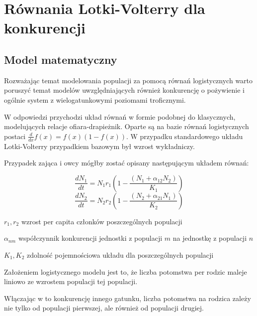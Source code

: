 \chapter{Równania Lotki-Volterry dla konkurencji}

\section{Model matematyczny}

\noindent Rozważając temat modelowania populacji za pomocą równań logistycznych warto poruszyć temat modelów uwzględniających również konkurencję o pożywienie i ogólnie system z wielogatunkowymi poziomami troficznymi.

\noindent W odpowiedzi przychodzi układ równań w formie podobnej do klasycznych, modelujących relacje ofiara-drapieżnik. Oparte są na bazie równań logistycznych postaci $\frac{d}{dx}f(x) = f(x)(1-f(x))$.  W przypadku standardowego układu Lotki-Volterry przypadkiem bazowym był wzrost wykładniczy.

\noindent Przypadek zająca i owcy mógłby zostać opisany następującym układem równań:

$$\frac{dN_1}{dt}=N_{1}r_{1}\left(1-\frac{\left({N_{1}+\alpha _{{12}}N_{2}}\right)}{K_1}\right)$$
$$\frac{dN_2}{dt}=N_{2}r_{2}\left(1-\frac{\left({N_{2}+\alpha _{{21}}N_{1}}\right)}{K_2}\right)$$

\begin{eqwhere}[2cm]
	\item[$r_1,r_2$] wzrost per capita członków poszczególnych populacji 
	\item[$\alpha_{nm}$] współczynnik konkurencji jednostki z populacji $m$ na jednostkę z populacji $n$
	\item[$K_1,K_2$] zdolność pojemnościowa układu dla poszczególnych populacji
\end{eqwhere}

\noindent Założeniem logistycznego modelu jest to, że liczba potomstwa per rodzic maleje liniowo ze wzrostem populacji tej populacji.

\noindent Włączając w to konkurencję innego gatunku, liczba potomstwa na rodzica zależy nie tylko od populacji pierwszej, ale również od populacji drugiej.

\newpage

